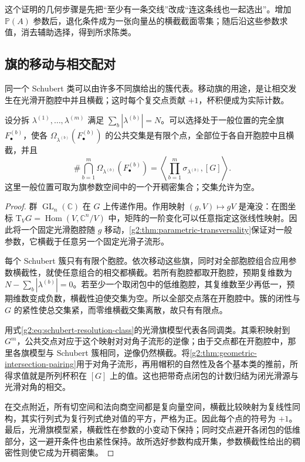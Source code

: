 这个证明的几何步骤是先把“至少有一条交线”改成“连这条线也一起选出”。增加 \(\mathbb P(A)\) 参数后，退化条件成为一张向量丛的横截截面零集；随后沿这些参数求值，消去辅助选择，得到所求陈类。

\subsection{旗的移动与相交配对}
\label{g2:subsec:2105:04}
同一个 Schubert 类可以由许多不同旗给出的簇代表。移动旗的用途，是让相交发生在光滑开胞腔中并且横截；这时每个复交点贡献 \(+1\)，杯积便成为实际计数。

\begin{proposition}\label{g2:prop:schubert-moving-flags}
	设分拆 \(\lambda^{(1)},\ldots,\lambda^{(m)}\) 满足 \(\sum_b|\lambda^{(b)}|=N\)。可以选择处于一般位置的完全旗 \(F_\bullet^{(b)}\)，使各 \(\Omega_{\lambda^{(b)}}(F_\bullet^{(b)})\) 的公共交集是有限个点，全部位于各自开胞腔中且横截，并且
	\[
		\#\bigcap_{b=1}^m\Omega_{\lambda^{(b)}}(F_\bullet^{(b)})
		=\left\langle\prod_{b=1}^m\sigma_{\lambda^{(b)}},[G]\right\rangle.
	\]
	这里一般位置可取为旗参数空间中的一个开稠密集合；交集允许为空。
\end{proposition}
\begin{proof}
	群 \(\operatorname{GL}_n(\mathbb C)\) 在 \(G\) 上传递作用。作用映射 \((g,V)\mapsto gV\) 是淹没：在图坐标 \(\mathrm T_VG=\operatorname{Hom}(V,\mathbb C^n/V)\) 中，矩阵的一阶变化可以任意指定这张线性映射。因此将一个固定光滑胞腔随 \(g\) 移动，\cref{g2:thm:parametric-transversality}保证对一般参数，它横截于任意另一个固定光滑子流形。

	每个 Schubert 簇只有有限个胞腔。依次移动这些旗，同时对全部胞腔组合应用参数横截性，就使任意组合的相交都横截。若所有胞腔都取开胞腔，预期复维数为 \(N-\sum_b|\lambda^{(b)}|=0\)。若至少一个取闭包中的低维胞腔，其复维数至少再低一，预期维数变成负数，横截性迫使交集为空。所以全部交点落在开胞腔中。簇的闭性与 \(G\) 的紧性使总交集紧，而零维横截交集离散，故只有有限点。

	用式\eqref{g2:eq:schubert-resolution-class}的光滑旗模型代表各同调类。其乘积映射到 \(G^m\)，公共交点对应于这个映射对对角子流形的逆像；由于交点都在开胞腔中，那里各旗模型与 Schubert 簇相同，逆像仍然横截。将\cref{g2:thm:geometric-intersection-pairing}用于对角子流形，再用帽积的自然性及各个基本类的推前，所得求值就是所列杯积在 \([G]\) 上的值。这也把带奇点闭包的计数归结为闭光滑源与光滑对角的相交。

	在交点附近，所有切空间和法向商空间都是复向量空间，横截比较映射为复线性同构，其实行列式为复行列式绝对值的平方，严格为正。因此每个点的符号为 \(+1\)。最后，光滑旗模型紧，横截性在参数的小变动下保持；同时交点避开各闭包的低维部分，这一避开条件也由紧性保持。故所选好参数构成开集，参数横截性给出的稠密性则使它成为开稠密集。
\end{proof}

